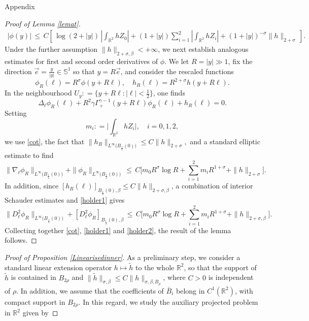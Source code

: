 \documentclass[11pt,reqno,a4paper]{amsart}
\numberwithin{equation}{section}
\newcommand{\R}{\mathbb{R}}
\newcommand{\defeq}{\mathrel{\mathop:}=}
\begin{document}
\begin{section}{Appendix}
\begin{proof}[Proof of Lemma \ref{lemat}]
\begin{equation}
\begin{aligned}
 | \phi (y)|
\,  \le  \,  C \left [ \,  \log (2+|y|) \,\left|\int_{\R^2} h Z_0\right|  +    (1+|y|) \sum_{i=1}^2 \left|\int_{\R^2} h Z_i\right|  +  (1+|y|)^{-\sigma}\|h\|_{2+\sigma}   \,\right ]. \end{aligned}
\end{equation}
Under the further assumption  $\|h\|_{2+\sigma,\beta} <+\infty$, we next establish analogous estimates for first and second order derivatives of $\phi$. We let $R=|y|\gg 1$, fix the direction $\vec e=\frac{y}{|y|}\in\mathbb{S}^1$ so that $y=R\vec e$, and consider the rescaled functions
\[
\phi_{R}(\ell)  = {R^{\sigma}} \phi \left(y+R\ell\right), \quad h_R(\ell) = R^{2+\sigma}h \left(y+R\ell\right). \]
In the neighbourhood $U_{y}\defeq \{y+R\ell: |\ell|<\frac{1}{2}\}$, one finds
\[\Delta_\ell\phi_{R}(\ell)  +   R^2 \gamma\Gamma^{\gamma-1}_{+}(y+R\ell)\phi_{R}(\ell) + h_R (\ell)  = 0.\]
Setting \[m_i \defeq  \Big| \int_{\R^2}  h Z_i \Big|, \quad i=0,1,2,\]
we use \eqref{cot}, the fact that $\|h_{R}\|_{L^{\infty}\big(B_{\frac 1 2}(0)\big)}\leq C \|h\|_{2+\sigma},$ and a standard elliptic estimate to find
 \begin{equation}\label{holder1}
 \|\nabla_{\ell} \phi_{R} \|_{L^{\infty}\big( B_{\frac 14}(0) \big)} + \|\phi_{R} \|_{L^{\infty}\big( B_{\frac 12}(0) \big)} \, \le\,  C\Big [ m_0 R^{\sigma}\log R + \sum_{i=1}^2 m_i R^{1+\sigma} + \| h\|_{2+\sigma} \Big ].
 \end{equation}
In addition, since $[h_R(\ell) ]_{B_{\frac 12} (0),\beta}\leq C\| h\|_{2+\sigma,\beta}$, a combination of interior Schauder estimates and \eqref{holder1} gives
\begin{equation}\label{holder2}
\|D^2_{\ell} \phi_{R} \|_{L^\infty\big( B_{\frac 14}(0) \big) } +  [ D^2_{\ell} \phi_{R} ]_{B_{\frac 1 4}(0),\beta} \, \le\,  C\Big [ m_0 R^{\sigma} \log R +   \sum_{i=1}^2 m_i R^{1+\sigma} +   \| h\|_{2+\sigma,\beta} \Big ].
\end{equation}
Collecting together \eqref{cot}, \eqref{holder1} and \eqref{holder2}, the result of the lemma follows.
\end{proof}
\begin{proof}[Proof of Proposition \ref{Linearisedinner}]
As a preliminary step, we consider a standard linear extension operator $h\mapsto \tilde{h} $ to the whole $\R^2$,
so that the support of $\tilde{h}$ is contained in $B_{2\rho}$ and $\|\tilde{h}\|_{\sigma,\beta} \le C\|h\|_{\sigma,\beta, B_\rho}$, where $C>0$ is independent of $\rho$. In addition,
we assume that the coefficients of $\bar{B}_i$ belong in $C^1(\R^2)$, with compact support in $B_{2\rho}$.
 In this regard, we study the auxiliary projected problem in $\R^2$ given by


\end{proof}
\end{section}
\end{document}
